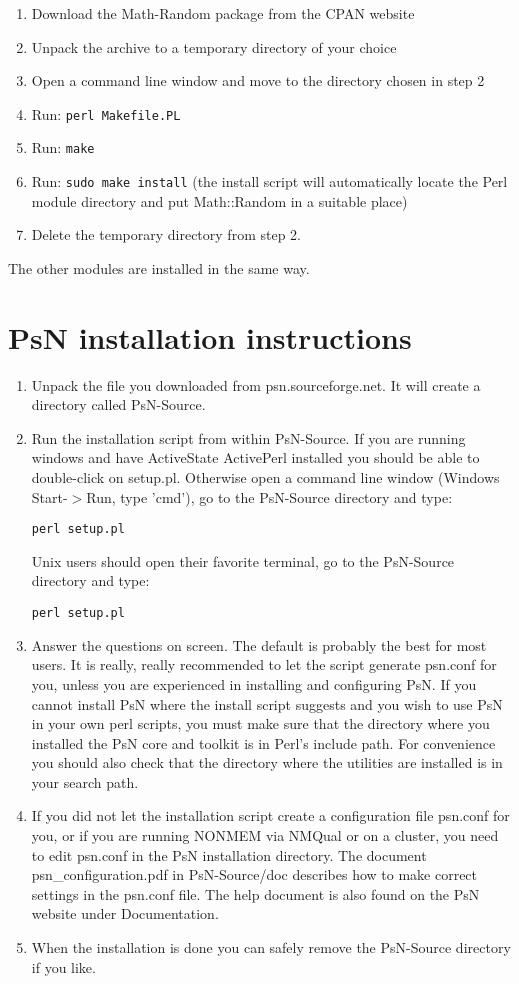 \begin{enumerate}
\item Download the Math-Random package from the CPAN website 
\item Unpack the archive to a temporary directory of your choice 
\item Open a command line window and move to the directory chosen in step 2 
\item Run: \verb|perl Makefile.PL|
\item Run: \verb|make| 
\item Run: \verb|sudo make install| (the install script will automatically locate the Perl module directory and put Math::Random in a suitable place) 
\item Delete the temporary directory from step 2.
\end{enumerate}

The other modules are installed in the same way.

\section{PsN installation instructions}

\begin{enumerate}
\item Unpack the file you downloaded from psn.sourceforge.net. It will create a directory called PsN-Source.
\item Run the installation script from within PsN-Source. If you are running windows and have ActiveState ActivePerl installed you should be able to double-click on setup.pl. Otherwise open a command line window (Windows Start-$>$Run, type 'cmd'), go to the PsN-Source directory and type: 
\begin{verbatim}
perl setup.pl
\end{verbatim}
Unix users should open their favorite terminal, go to the PsN-Source directory and type:
\begin{verbatim}
perl setup.pl
\end{verbatim}
\item Answer the questions on screen. The default is probably the best for most users. It is really, really recommended to let the script generate psn.conf for you, unless you are experienced in installing and configuring PsN.
If you cannot install PsN where the install script suggests and you wish to use PsN in your own perl scripts, you must make sure that the directory where you installed the PsN core and toolkit is in Perl's include path. For convenience you should also check that the directory where the utilities are installed is in your search path. 
\item If you did not let the installation script create a configuration file psn.conf for you, or if you are running NONMEM via NMQual or on a cluster, you need to edit psn.conf in the PsN installation directory. The document psn\_configuration.pdf in PsN-Source/doc describes how to make correct settings in the psn.conf file. The help document is also found on the PsN website under Documentation.
\item When the installation is done you can safely remove the PsN-Source directory if you like. 
\end{enumerate}


